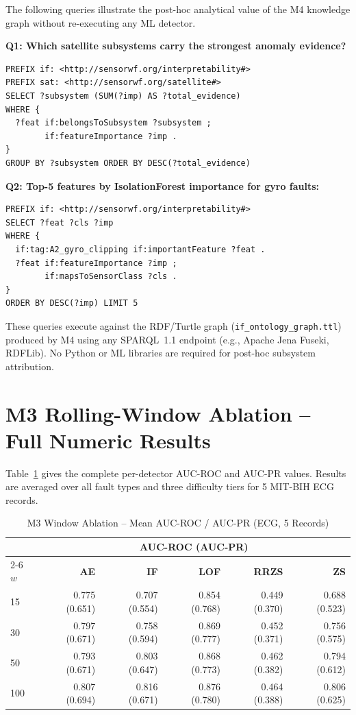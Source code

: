 \documentclass[conference]{IEEEtran}
\begin{document}
The following queries illustrate the post-hoc analytical value of the M4 knowledge graph without re-executing any ML detector.

\noindent\textbf{Q1: Which satellite subsystems carry the strongest anomaly evidence?}
\begin{lstlisting}[basicstyle=\ttfamily\scriptsize]
PREFIX if: <http://sensorwf.org/interpretability#>
PREFIX sat: <http://sensorwf.org/satellite#>
SELECT ?subsystem (SUM(?imp) AS ?total_evidence)
WHERE {
  ?feat if:belongsToSubsystem ?subsystem ;
        if:featureImportance ?imp .
}
GROUP BY ?subsystem ORDER BY DESC(?total_evidence)
\end{lstlisting}

\noindent\textbf{Q2: Top-5 features by IsolationForest importance for gyro faults:}
\begin{lstlisting}[basicstyle=\ttfamily\scriptsize]
PREFIX if: <http://sensorwf.org/interpretability#>
SELECT ?feat ?cls ?imp
WHERE {
  if:tag:A2_gyro_clipping if:importantFeature ?feat .
  ?feat if:featureImportance ?imp ;
        if:mapsToSensorClass ?cls .
}
ORDER BY DESC(?imp) LIMIT 5
\end{lstlisting}

These queries execute against the RDF/Turtle graph (\texttt{if\_ontology\_graph.ttl}) produced by M4 using any SPARQL~1.1 endpoint (e.g., Apache Jena Fuseki, RDFLib). No Python or ML libraries are required for post-hoc subsystem attribution.

\section{M3 Rolling-Window Ablation -- Full Numeric Results}
\label{app:ablation}

Table~\ref{tab:ablation_full} gives the complete per-detector AUC-ROC and AUC-PR values. Results are averaged over all fault types and three difficulty tiers for 5 MIT-BIH ECG records.

\begin{table}[h]
\caption{M3 Window Ablation -- Mean AUC-ROC / AUC-PR (ECG, 5 Records)}
\label{tab:ablation_full}
\centering
\scriptsize
\setlength{\tabcolsep}{3pt}
\begin{tabular}{@{}lrrrrr@{}}
\toprule
 & \multicolumn{5}{c}{\textbf{AUC-ROC (AUC-PR)}} \\
\cmidrule{2-6}
$w$ & \textbf{AE} & \textbf{IF} & \textbf{LOF} & \textbf{RRZS} & \textbf{ZS} \\
\midrule
  15 & 0.775 (0.651) & 0.707 (0.554) & 0.854 (0.768) & 0.449 (0.370) & 0.688 (0.523) \\
  30 & 0.797 (0.671) & 0.758 (0.594) & 0.869 (0.777) & 0.452 (0.371) & 0.756 (0.575) \\
  50 & 0.793 (0.671) & 0.803 (0.647) & 0.868 (0.773) & 0.462 (0.382) & 0.794 (0.612) \\
 100 & 0.807 (0.694) & 0.816 (0.671) & 0.876 (0.780) & 0.464 (0.388) & 0.806 (0.625) \\
\bottomrule
\end{tabular}
\end{table}
\end{document}
